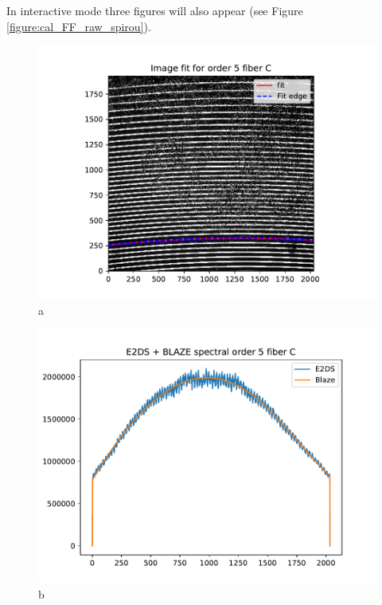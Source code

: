 \noindent In interactive mode three figures will also appear (see Figure \ref{figure:cal_FF_raw_spirou}).

\begin{figure}

\begin{center}
\begin{minipage}{.495\textwidth}
\begin{center}
\includegraphics[width=\textwidth]{Figures/cal_FF_raw_spirou_1.pdf}
a
\end{center}
\end{minipage}%
\begin{minipage}{.495\textwidth}
\begin{center}
\includegraphics[width=\textwidth]{Figures/cal_FF_raw_spirou_2.pdf}
b
\end{center}
\end{minipage}%
\end{center}


\end{figure}
